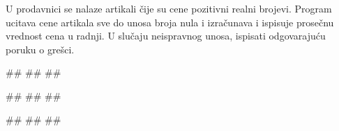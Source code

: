 \begin{Exercise}[label=PET_19] 
U prodavnici se nalaze artikali čije su cene pozitivni realni
brojevi. Program ucitava cene artikala sve do unosa broja nula i
izračunava i ispisuje prosečnu vrednost cena u radnji.
U slučaju neispravnog unosa, ispisati odgovarajuću poruku o grešci.

\begin{miditest}
\begin{upotreba}{1}
#\naslovInt#
##
##
\end{upotreba}
\end{miditest}
\begin{miditest}
\begin{upotreba}{2}
#\naslovInt#
##
##
\end{upotreba}
\end{miditest}

\begin{miditest}
\begin{upotreba}{3}
#\naslovInt#
##
##
\end{upotreba}
\end{miditest}
\end{Exercise}
\ifresenja
\begin{Answer}[ref=PET_19]
\end{Answer}
\fi


